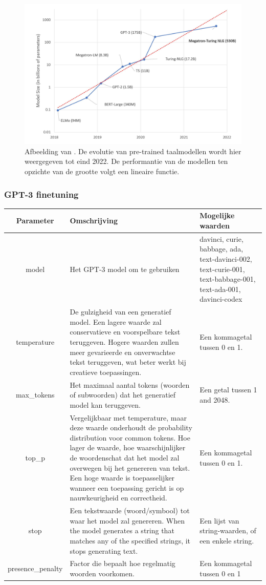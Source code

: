 \begin{figure}[H]
	\includegraphics{img/graph-language-models.png}
	\caption{Afbeelding van \textcite{Simon2021}. De evolutie van pre-trained taalmodellen wordt hier weergegeven tot eind 2022. De performantie van de modellen ten opzichte van de grootte volgt een lineaire functie.}
\end{figure}

\subsubsection{GPT-3 finetuning}

\begin{tabular}{|c|p{7cm}|p{5cm}|}
	\hline
	Parameter & Omschrijving & Mogelijke waarden \\
	\hline
	model & Het GPT-3 model om te gebruiken & davinci, curie, babbage, ada, text-davinci-002, text-curie-001, text-babbage-001, text-ada-001, davinci-codex \\
	\hline
	temperature & De gulzigheid van een generatief model. Een lagere waarde zal conservatieve en voorspelbare tekst teruggeven. Hogere waarden zullen meer gevarieerde en onverwachtse tekst teruggeven, wat beter werkt bij creatieve toepassingen. & Een kommagetal tussen 0 en 1. \\
	\hline
	max\_tokens & Het maximaal aantal tokens (woorden of subwoorden) dat het generatief model kan teruggeven. & Een getal tussen 1 and 2048. \\
	\hline
	top\_p & Vergelijkbaar met temperature, maar deze waarde onderhoudt de probability distribution voor common tokens. Hoe lager de waarde, hoe waarschijnlijker de woordenschat dat het model zal overwegen bij het genereren van tekst. Een hoge waarde is toepasselijker wanneer een toepassing gericht is op nauwkeurigheid en correctheid. & Een kommagetal tussen 0 en 1. \\
	\hline
	stop & Een tekstwaarde (woord/symbool) tot waar het model zal genereren. When the model generates a string that matches any of the specified strings, it stops generating text. & Een lijst van string-waarden, of een enkele string. \\
	\hline
	presence\_penalty & Factor die bepaalt hoe regelmatig woorden voorkomen. & Een kommagetal tussen 0 en 1 \\
	\hline
\end{tabular}

